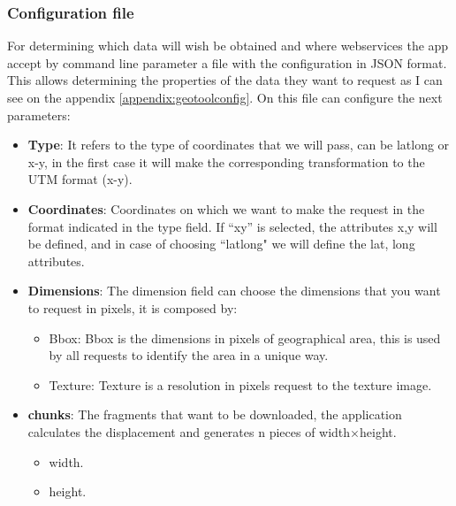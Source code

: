 \documentclass[10pt,a4paper,twocolumn,twoside]{article}
\begin{document}
\subsubsection{Configuration file}
\label{section:configfilegeotool}
For determining which data will wish be obtained and where webservices the app accept by command line parameter a file with the configuration in JSON format. This allows determining the properties of the data they want to request as I can see on the appendix \ref{appendix:geotoolconfig}. On this file can configure the next parameters:

\begin{itemize}
\setlength\itemsep{0em}
  \item \textbf{Type}: It refers to the type of coordinates that we will pass, can be latlong or x-y, in the first case it will make the corresponding transformation to the UTM format (x-y).
  
  \item \textbf{Coordinates}: Coordinates on which we want to make the request in the format indicated in the type field. If ``xy'' is selected, the attributes x,y will be defined, and in case of choosing ``latlong" we will define the lat, long attributes.

  \item \textbf{Dimensions}: The dimension field can choose the dimensions that you want to request in pixels, it is composed by:
  
  \begin{itemize}
  \setlength\itemsep{0em}
  \vspace{-0.2cm}
    \item Bbox: Bbox is the dimensions in pixels of geographical area, this is used by all requests to identify the area in a unique way.
    \item Texture: Texture is a resolution in pixels request to the texture image.
  \end{itemize}
  
  \item \textbf{chunks}: The fragments that want to be downloaded, the application calculates the displacement and generates n pieces of width$\times$height.
  \vspace{-0.2cm}
  \begin{itemize}
  \setlength\itemsep{0em}
    \item width.
    \item height.
  \end{itemize}


\end{itemize}
\end{document}
